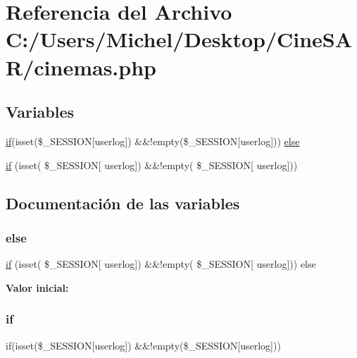 \hypertarget{cinemas_8php}{}\section{Referencia del Archivo C\+:/\+Users/\+Michel/\+Desktop/\+Cine\+S\+A\+R/cinemas.php}
\label{cinemas_8php}
\subsection*{Variables}
\begin{DoxyCompactItemize}
\item 
\mbox{\hyperlink{register_8php_aefb5893336d7ead40ae915367f4b82cc}{if}}(isset(\$\+\_\+\+S\+E\+S\+S\+I\+ON\mbox{[}\textquotesingle{}userlog\textquotesingle{}\mbox{]}) \&\&!empty(\$\+\_\+\+S\+E\+S\+S\+I\+ON\mbox{[}\textquotesingle{}userlog\textquotesingle{}\mbox{]})) \mbox{\hyperlink{cinemas_8php_a3e85a20b0f9c4bed1d7e6bf901f6030c}{else}}
\item 
\mbox{\hyperlink{cinemas_8php_aefb5893336d7ead40ae915367f4b82cc}{if}} (isset( \$\+\_\+\+S\+E\+S\+S\+I\+ON\mbox{[} \textquotesingle{}userlog\textquotesingle{}\mbox{]}) \&\&!empty( \$\+\_\+\+S\+E\+S\+S\+I\+ON\mbox{[} \textquotesingle{}userlog\textquotesingle{}\mbox{]}))
\end{DoxyCompactItemize}


\subsection{Documentación de las variables}
\mbox{\label{cinemas_8php_a3e85a20b0f9c4bed1d7e6bf901f6030c}} 
\subsubsection{\texorpdfstring{else}{else}}
{\footnotesize\ttfamily \mbox{\hyperlink{register_8php_aefb5893336d7ead40ae915367f4b82cc}{if}} (isset( \$\+\_\+\+S\+E\+S\+S\+I\+ON\mbox{[} \textquotesingle{}userlog\textquotesingle{}\mbox{]}) \&\&!empty( \$\+\_\+\+S\+E\+S\+S\+I\+ON\mbox{[} \textquotesingle{}userlog\textquotesingle{}\mbox{]})) else}

{\bfseries Valor inicial\+:}
\begin{DoxyCode}{0}
\DoxyCodeLine{\{}

\end{DoxyCode}
\mbox{\label{cinemas_8php_aefb5893336d7ead40ae915367f4b82cc}} 
\subsubsection{\texorpdfstring{if}{if}}
{\footnotesize\ttfamily if(isset(\$\+\_\+\+S\+E\+S\+S\+I\+ON\mbox{[}\textquotesingle{}userlog\textquotesingle{}\mbox{]}) \&\&!empty(\$\+\_\+\+S\+E\+S\+S\+I\+ON\mbox{[}\textquotesingle{}userlog\textquotesingle{}\mbox{]}))}

